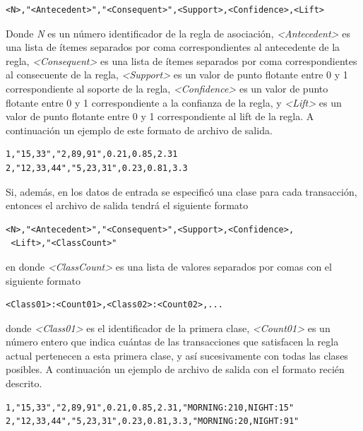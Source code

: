 \begin{lstlisting}[basicstyle=\ttfamily]
<N>,"<Antecedent>","<Consequent>",<Support>,<Confidence>,<Lift>
\end{lstlisting}

Donde \textit{N} es un número identificador de la regla de asociación, \textit{<Antecedent>} es una lista de ítemes separados por coma correspondientes al antecedente de la regla, \textit{<Consequent>} es una lista de ítemes separados por coma correspondientes al consecuente de la regla, \textit{<Support>} es un valor de punto flotante entre 0 y 1 correspondiente al soporte de la regla, \textit{<Confidence>} es un valor de punto flotante entre 0 y 1 correspondiente a la confianza de la regla, y \textit{<Lift>} es un valor de punto flotante entre 0 y 1 correspondiente al lift de la regla. A continuación un ejemplo de este formato de archivo de salida.

\begin{lstlisting}[basicstyle=\ttfamily]
1,"15,33","2,89,91",0.21,0.85,2.31
2,"12,33,44","5,23,31",0.23,0.81,3.3
\end{lstlisting}

Si, además, en los datos de entrada se especificó una clase para cada transacción, entonces el archivo de salida tendrá el siguiente formato

\begin{lstlisting}[basicstyle=\ttfamily]
<N>,"<Antecedent>","<Consequent>",<Support>,<Confidence>,
 <Lift>,"<ClassCount>"
\end{lstlisting}

en donde \textit{<ClassCount>} es una lista de valores separados por comas con el siguiente formato

\begin{lstlisting}[basicstyle=\ttfamily]
<Class01>:<Count01>,<Class02>:<Count02>,...
\end{lstlisting}

donde \textit{<Class01>} es el identificador de la primera clase, \textit{<Count01>} es un número entero que indica cuántas de las transacciones que satisfacen la regla actual pertenecen a esta primera clase, y así sucesivamente con todas las clases posibles. A continuación un ejemplo de archivo de salida con el formato recién descrito.

\begin{lstlisting}[basicstyle=\ttfamily]
1,"15,33","2,89,91",0.21,0.85,2.31,"MORNING:210,NIGHT:15"
2,"12,33,44","5,23,31",0.23,0.81,3.3,"MORNING:20,NIGHT:91"
\end{lstlisting}


